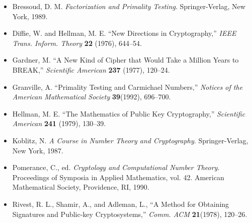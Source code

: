 {\small
\begin{itemize}
 
\item[{\bf [1]}]
Bressoud, D. M. {\it Factorization and Primality Testing}.
Springer-Verlag, New York, 1989. 
 
\item[{\bf [2]}]
Diffie, W. and Hellman, M. E. ``New Directions in
Cryptography,'' {\it IEEE Trans. Inform. Theory} {\bf
22} (1976), 644--54.
 
\item[{\bf [3]}]
Gardner, M. ``A New Kind of Cipher that Would Take a Million
Years to BREAK,'' {\it Scientific American} {\bf
237} (1977), 120--24.
 
\item[{\bf [4]}]%
Granville, A. ``Primality Testing and Carmichael Numbers,'' {\it
Notices of the American Mathematical Society} {\bf 39}(1992),
696--700. 
 
 
 
\item[{\bf [5]}]
Hellman, M. E. ``The Mathematics of Public Key
Cryptography,''  {\it Scientific American} {\bf 241}
(1979), 130--39.
 
\item[{\bf [6]}]%
Koblitz, N. {\it A Course in Number Theory and Cryptography}.
Springer-Verlag, New York, 1987. 
 
 
\item[{\bf [7]}]
Pomerance, C., ed. {\it Cryptology and Computational Number
Theory}. Proceedings of Symposia in Applied Mathematics,
vol. 42. American Mathematical Society, Providence, RI,
1990.
 
 
\item[{\bf [8]}]
Rivest, R. L., Shamir, A., and Adleman, L., ``A Method for
Obtaining Signatures and Public-key Cryptosystems,'' {\it
Comm. ACM} {\bf 21}(1978), 120--26.
 
\end{itemize}
}
 
 
 
